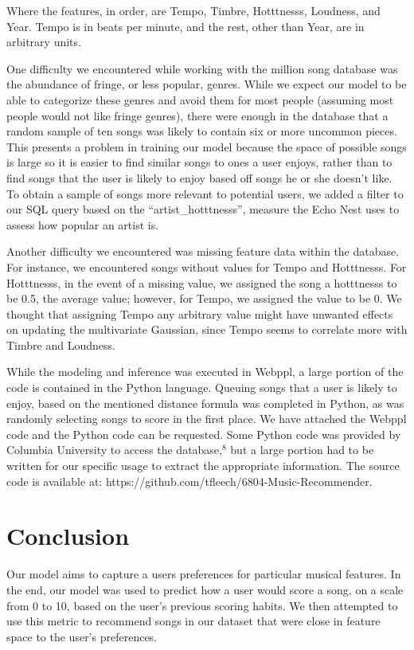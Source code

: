 \documentclass{amsart}
\theoremstyle{plain}
\theoremstyle{definition}
\begin{document}
  	Where the features, in order, are Tempo, Timbre, Hotttnesss, Loudness, and Year. Tempo is in beats per minute, and the rest, other than Year, are in arbitrary units.
  	
  	One difficulty we encountered while working with the million song database was the abundance of fringe, or less popular, genres.  While we expect our model to be able to categorize these genres and avoid them for most people (assuming most people would not like fringe genres), there were enough in the database that a random sample of ten songs was likely to contain six or more uncommon pieces.  This presents a problem in training our model because the space of possible songs is large so it is easier to find similar songs to ones a user enjoys, rather than to find songs that the user is likely to enjoy based off songs he or she doesn't like.  To obtain a sample of songs more relevant to potential users, we added a filter to our SQL query based on the “artist\_hotttnesss”, measure the Echo Nest uses to assess how popular an artist is.
  	
  	Another difficulty we encountered was missing feature data within the database. For instance, we encountered songs without values for Tempo and Hotttnesss. For Hotttnesss, in the event of a missing value, we assigned the song a hotttnesss to be 0.5, the average value; however, for Tempo, we assigned the value to be 0. We thought that assigning Tempo any arbitrary value might have unwanted effects on updating the multivariate Gaussian, since Tempo seems to correlate more with Timbre and Loudness.
  	
  	While the modeling and inference was executed in Webppl, a large portion of the code is contained in the Python language. Queuing songs that a user is likely to enjoy, based on the mentioned distance formula was completed in Python, as was randomly selecting songs to score in the first place. We have attached the Webppl code and the Python code can be requested. Some Python code was provided by Columbia University to access the database,$^{8}$ but a large portion had to be written for our specific usage to extract the appropriate information. The source code is available at: https://github.com/tfleech/6804-Music-Recommender.
  	
  	\section{Conclusion}
   	
   	Our model aims to capture a users preferences for particular musical features. In the end, our model was used to predict how a user would score a song, on a scale from 0 to 10, based on the user's previous scoring habits. We then attempted to use this metric to recommend songs in our dataset that were close in feature space to the user's preferences.
   	
\end{document}
